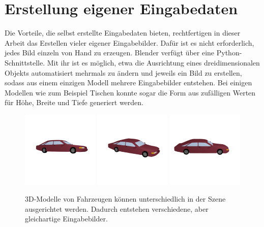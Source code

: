 \section{Erstellung eigener Eingabedaten}

Die Vorteile, die selbst erstellte Eingabedaten bieten, rechtfertigen in dieser Arbeit das Erstellen vieler eigener Eingabebilder. Dafür ist es nicht erforderlich, jedes Bild einzeln von Hand zu erzeugen. Blender verfügt über eine Python-Schnittstelle. Mit ihr ist es möglich, etwa die Ausrichtung eines dreidimensionalen Objekts automatisiert mehrmals zu ändern und jeweils ein Bild zu erstellen, sodass aus einem einzigen Modell mehrere Eingabebilder entstehen. Bei einigen Modellen wie zum Beispiel Tischen konnte sogar die Form aus zufälligen Werten für Höhe, Breite und Tiefe generiert werden.

\begin{figure}[h]
	\centering
  \includegraphics[width=0.325\textwidth]{bilder/limo1_m.png}
  \includegraphics[width=0.325\textwidth]{bilder/limo2_m.png}
  \includegraphics[width=0.325\textwidth]{bilder/limo3_m.png}

	\caption[Verschiedene Perspektiven]{3D-Modelle von Fahrzeugen können unterschiedlich in der Szene ausgerichtet werden. Dadurch entstehen verschiedene, aber gleichartige Eingabebilder.}
	\label{fig:limo}
\end{figure}


